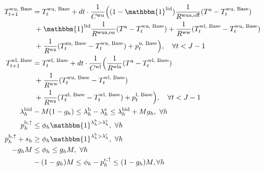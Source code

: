 \documentclass[conference]{IEEEtran}
\begin{document}
{\begin{subequations}
\begin{align}
        T^{\text{wu, Base}}_{t+1} & = T^{\text{wu, Base}}_{t} + dt \cdot \frac{1}{C^{\text{wu}}}\Bigl( (1-\mathbbm{1}^{\text{lid}}) \frac{1}{R^{\text{wua},\text{off}}} (T^{\text{a}} - T^{\text{wu, Base}}_{t}) \notag  \\ & \mspace{5mu} + \mathbbm{1}^{\text{lid}} \frac{1}{R^{\text{wua},\text{on}}} (T^{\text{a}} - T^{\text{wu, Base}}_{t}) + \frac{1}{R^{\text{ww}}} (T^{\text{wl, Base}}_{t} - T^{\text{wu, Base}}_{t}) \notag \\ & \mspace{5mu} + \frac{1}{R^{\text{wz}}} (T^{\text{zu, Base}}_{t} - T^{\text{wu, Base}}_{t}) + p^{\text{u, Base}}_{t} \Bigr), \quad \forall{t} < J-1 \label{P2:StateSpaceBase3} \\
        T^{\text{wl, Base}}_{t+1} & = T^{\text{wl, Base}}_{t} + dt \cdot \frac{1}{C^{\text{wl}}}\Bigl( \frac{1}{R^{\text{wla}}} (T^{\text{a}} - T^{\text{wl, Base}}_{t}) \notag                                           \\ & \mspace{5mu} + \frac{1}{R^{\text{ww}}} (T^{\text{wu, Base}}_{t} - T^{\text{wl, Base}}_{t}) \notag \\ & \mspace{5mu}  + \frac{1}{R^{\text{wz}}} (T^{\text{zl, Base}}_{t} - T^{\text{wl, Base}}_{t}) + p^{\text{l, Base}}_{t} \Bigr), \quad \forall{t} < J-1 \label{P2:StateSpaceBase4} \\
        \lambda_{h}^{\rm{bid}} & - M  (1 - g_{h}) \leq \lambda_{h}^{\rm{b}} - \lambda_{h}^{\rm{s}} \leq \lambda_{h}^{\rm{bid}} + M  g_{h}, \ \forall{h}                               \label{con_bid:subeq1} \\
        p^{\rm{b}, \uparrow}_{h} & \leq \phi_{h}  \mathbbm{1}^{\lambda^{\rm{b}}_{h} > \lambda^{\rm{s}}_{h}}, \  \forall{h}                          \label{con_bid:subeq3}                                                \\
        p^{\rm{b}, \uparrow}_{h} + s_{h} & \geq \phi_{h}  \mathbbm{1}^{\lambda^{\rm{b}}_{h} > \lambda^{\rm{s}}_{h}},  \ \forall{h}            \label{con_bid:subeq4}                                               \\
         -g_{h}  M & \leq \phi_{h} \leq g_{h}  M,\  \forall{h}                                   \label{con_bid:subeq5}                                                                                                            \\
         & -(1 - g_{h})  M \leq \phi_{h} - p^{\rm{r},\uparrow}_{h} \leq (1 - g_{h}) M,  \forall{h}\                                                                                    \label{con_bid:subeq7} \\

\end{align}
\end{subequations}}
\end{document}
